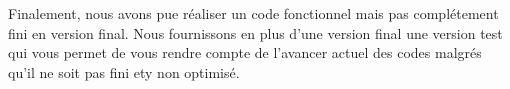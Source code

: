 Finalement, nous avons pue réaliser un code fonctionnel mais pas complétement fini en version final. 
Nous fournissons en plus d'une version final une version test qui vous permet de vous rendre compte de l'avancer actuel des codes malgrés qu'il ne soit pas fini ety non optimisé.
\newpage